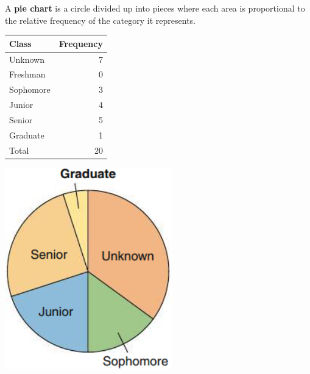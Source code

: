 \documentclass[../mathNotesPreamble]{subfiles}
\begin{document}
  \begin{defn*}
    A \textbf{pie chart} is a circle divided up into pieces where each area is proportional to the relative frequency of the category it represents.
  \end{defn*}
  \begin{ex*}
  
  \end{ex*}
  \noindent
  \begin{minipage}{0.3\linewidth}
    \begin{center}
      \begin{tabular}{@{}lr@{}}\toprule
        Class& Frequency\\\midrule
        Unknown& 7\\
        Freshman& 0\\
        Sophomore& 3\\
        Junior& 4\\
        Senior& 5\\
        Graduate& 1\\\midrule
        Total& 20\\\bottomrule
      \end{tabular}
    \end{center}
  \end{minipage}%
  \begin{minipage}{0.3\linewidth}
    \includegraphics[width=\linewidth]{images/math211_figure_2p27}
  \end{minipage}
  
  

  \pagebreak
\end{document}
